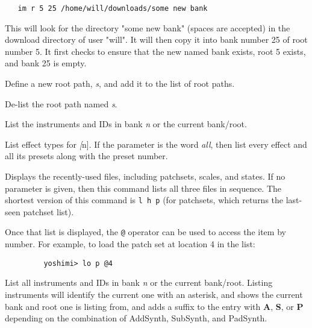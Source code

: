 \begin{verbatim}
   im r 5 25 /home/will/downloads/some new bank
\end{verbatim}

      This will look for the directory "some new bank" (spaces are accepted) in
      the download directory of user "will". It will then copy it into bank number
      25 of root number 5. It first checks to ensure that the new named bank
      exists, root 5 exists, and bank 25 is empty.

      Define a new root path, \textsl{s}, and add it to the list of root paths.

      De-list the root path named \textsl{s}.

      List the instruments and IDs in bank \textsl{n} or the
      current bank/root.

      List effect types for \textsl[n].
      If the parameter is the word \textsl{all},
      then list every effect and all its
      presets along with the preset number.

      Displays the recently-used files, including patchsets, scales, and
      states.  If no parameter is given, then this command lists all three
      files in sequence.  The shortest version of this command is
      \texttt{l h p} (for patchsets, which returns the last-seen patchset list).

      Once that list is displayed,
      the \texttt{@} operator can be used to access
      the item by number.  For example, to load the patch set at location 4 in
      the list:

      \begin{verbatim}
         yoshimi> lo p @4
      \end{verbatim}

      List all instruments and IDs in bank \textsl{n}
      or the current bank/root.
      Listing instruments will identify the current one with an asterisk, and
      shows the current bank and root one is listing from, and adds a suffix to
      the entry with \textbf{A}, \textbf{S}, or \textbf{P}
      depending on the combination of AddSynth, SubSynth, and PadSynth.

